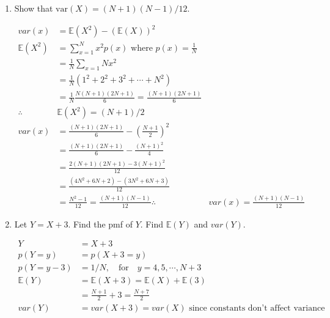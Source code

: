 \begin{enumerate}[label=(\alph*)]
        \item Show that $\mathrm{var}(X) = (N+1)(N-1)/12$.
        \\
        \begin{mdframed}
            \begin{align*}
                var(x)          & = \mathbb{E}(X^2) - (\mathbb{E}(X))^2                         \\
                \mathbb{E}(X^2) & = \sum_{x=1}^{N} x^2p(x) \text{ where } p(x) = \frac{1}{N}    \\
                & = \frac{1}{N} \sum_{x=1}{N} x^2                                               \\
                & = \frac{1}{N} (1^2 + 2^2 + 3^2 + \cdots + N^2)                                \\
                & = \frac{1}{N}\frac{N(N+1)(2N+1)}{6} = \frac{(N+1)(2N+1)}{6}                   \\
\therefore \quad& \mathbb{E}(X^2) = (N+1)/2                                                     \\
                var(x)          & = \frac{(N+1)(2N+1)}{6} - \left(\frac{N+1}{2}\right)^2        \\
                                & = \frac{(N+1)(2N+1)}{6} - \frac{(N+1)^2}{4}                   \\
                                & = \frac{2(N+1)(2N+1)-3(N+1)^2}{12}                            \\
                                & = \frac{(4N^2+6N+2)-(3N^2+6N+3)}{12}                          \\
                                & = \frac{N^2-1}{12} = \frac{(N+1)(N-1)}{12}  
                \therefore \quad& var(x) = \frac{(N+1)(N-1)}{12}
            \end{align*}
        \end{mdframed}

        \pagebreak

        \item Let $Y = X+3$. Find the pmf of $Y$. Find $\mathbb{E}(Y)$ and $var(Y)$.
        \\
        \begin{mdframed}
            \begin{align*}
                Y               & = X + 3                                                   \\
                p(Y = y)        & = p(X + 3 = y)                                            \\
                p(Y = y - 3)    & = 1/N, \quad \text{for} \quad y = 4, 5, \cdots, N+3       \\
                \mathbb{E}(Y)   & = \mathbb{E}(X + 3) = \mathbb{E}(X) + \mathbb{E}(3)       \\
                                & = \frac{N+1}{2} + 3 = \frac{N+7}{2}                       \\
                var(Y)          & = var(X + 3) = var(X) \text{ since constants don't affect variance}
            \end{align*}
        \end{mdframed}
    \end{enumerate}

